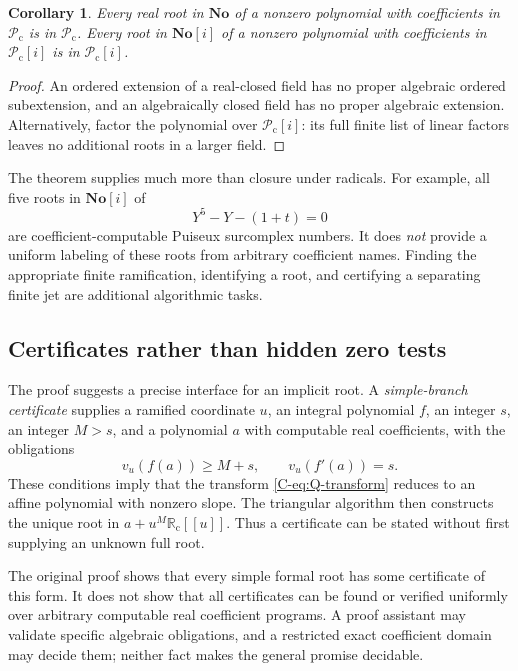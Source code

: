\documentclass[11pt,letterpaper]{article}
\numberwithin{equation}{section}
\newtheorem{corollary}[theorem]{Corollary}
\theoremstyle{definition}
\theoremstyle{remark}
\newcommand{\No}{\mathbf{No}}
\newcommand{\Rc}{\mathbb R_{\mathrm c}}
\newcommand{\Pc}{\mathcal P_{\mathrm c}}
\begin{document}
\begin{corollary}
Every real root in $\No$ of a nonzero polynomial with coefficients in $\Pc$
is in $\Pc$. Every root in $\No[i]$ of a nonzero polynomial with coefficients
in $\Pc[i]$ is in $\Pc[i]$.
\end{corollary}
\begin{proof}
An ordered extension of a real-closed field has no proper algebraic ordered
subextension, and an algebraically closed field has no proper algebraic
extension. Alternatively, factor the polynomial over $\Pc[i]$: its full
finite list of linear factors leaves no additional roots in a larger field.
\end{proof}

The theorem supplies much more than closure under radicals. For example,
all five roots in $\No[i]$ of
\[
 Y^5-Y-(1+t)=0
\]
are coefficient-computable Puiseux surcomplex numbers. It does \emph{not}
provide a uniform labeling of these roots from arbitrary coefficient names.
Finding the appropriate finite ramification, identifying a root, and
certifying a separating finite jet are additional algorithmic tasks.

\subsection{Certificates rather than hidden zero tests}

The proof suggests a precise interface for an implicit root. A
\emph{simple-branch certificate} supplies a ramified coordinate $u$, an
integral polynomial $f$, an integer $s$, an integer $M>s$, and a polynomial
$a$ with computable real coefficients, with the obligations
\begin{equation}
 v_u(f(a))\geq M+s,\qquad v_u(f'(a))=s.
 \label{C-eq:branch-cert}
\end{equation}
These conditions imply that the transform \eqref{C-eq:Q-transform} reduces
to an affine polynomial with nonzero slope. The triangular algorithm then
constructs the unique root in $a+u^M\Rc[[u]]$. Thus a certificate can be
stated without first supplying an unknown full root.

The original proof shows that every simple formal root has some certificate
of this form. It does not show that all certificates can be found or
verified uniformly over arbitrary computable real coefficient programs.
A proof assistant may validate specific algebraic obligations, and a
restricted exact coefficient domain may decide them; neither fact makes
the general promise decidable.
\end{document}
